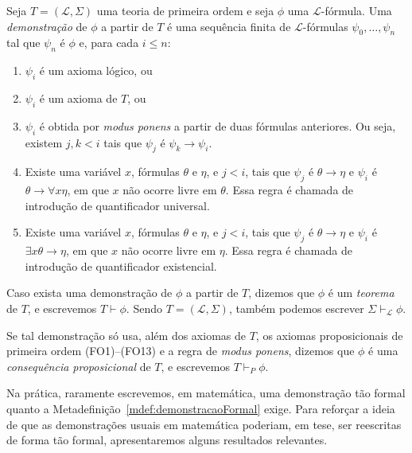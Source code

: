\begin{metadefinition}[Demonstração]\label{mdef:demonstracaoFormal}
    Seja $T=(\mathcal L,\Sigma)$ uma teoria de primeira ordem e seja $\phi$ uma $\mathcal L$-fórmula.
    Uma \emph{demonstração} de $\phi$ a partir de $T$ é uma sequência finita de $\mathcal L$-fórmulas $\psi_0, \dots, \psi_n$ tal que $\psi_n$ é $\phi$ e, para cada $i\leq n$:
    \begin{enumerate}[label=(\roman*)]
        \item $\psi_i$ é um axioma lógico, ou
        \item $\psi_i$ é um axioma de $T$, ou
        \item $\psi_i$ é obtida por \emph{modus ponens} a partir de duas fórmulas anteriores.
        Ou seja, existem $j, k<i$ tais que $\psi_j$ é  $\psi_k \rightarrow \psi_i$.
        \item Existe uma variável $x$, fórmulas $\theta$ e $\eta$, e $j<i$, tais que $\psi_j$ é $\theta\rightarrow \eta$ e $\psi_i$ é $\theta\rightarrow \forall x \eta$, em que $x$ não ocorre livre em $\theta$.
        Essa regra é chamada de introdução de quantificador universal.
        \item Existe uma variável $x$, fórmulas $\theta$ e $\eta$, e $j<i$, tais que $\psi_j$ é $\theta\rightarrow \eta$ e $\psi_i$ é $\exists x \theta\rightarrow \eta$, em que $x$ não ocorre livre em $\eta$.
        Essa regra é chamada de introdução de quantificador existencial.
    \end{enumerate}

    Caso exista uma demonstração de $\phi$ a partir de $T$, dizemos que $\phi$ é um \emph{teorema} de $T$, e escrevemos $T \vdash \phi$.
    Sendo $T=(\mathcal L, \Sigma)$, também podemos escrever $\Sigma \vdash_\mathcal L \phi$.

    Se tal demonstração só usa, além dos axiomas de $T$, os axiomas proposicionais de primeira ordem (FO1)--(FO13) e a regra de \emph{modus ponens}, dizemos que $\phi$ é uma \emph{consequência proposicional} de $T$, e escrevemos $T \vdash_P \phi$.
\end{metadefinition}

Na prática, raramente escrevemos, em matemática, uma demonstração tão formal quanto a Metadefinição~\ref{mdef:demonstracaoFormal} exige.
Para reforçar a ideia de que as demonstrações usuais em matemática poderiam, em tese, ser reescritas de forma tão formal, apresentaremos alguns resultados relevantes.

